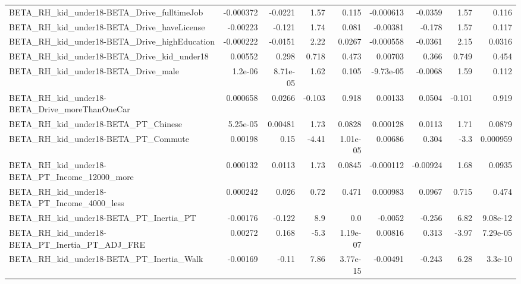 \begin{tabular}{lrrrrrrrr}
BETA\_RH\_kid\_under18-BETA\_Drive\_fulltimeJob         &   -0.000372 &      -0.0221 &     1.57 &    0.115 &  -0.000613 &     -0.0359 &         1.57 &         0.116 \\
BETA\_RH\_kid\_under18-BETA\_Drive\_haveLicense         &    -0.00223 &       -0.121 &     1.74 &    0.081 &   -0.00381 &      -0.178 &         1.57 &         0.117 \\
BETA\_RH\_kid\_under18-BETA\_Drive\_highEducation       &   -0.000222 &      -0.0151 &     2.22 &   0.0267 &  -0.000558 &     -0.0361 &         2.15 &        0.0316 \\
BETA\_RH\_kid\_under18-BETA\_Drive\_kid\_under18         &     0.00552 &        0.298 &    0.718 &    0.473 &    0.00703 &       0.366 &        0.749 &         0.454 \\
BETA\_RH\_kid\_under18-BETA\_Drive\_male                &     1.2e-06 &     8.71e-05 &     1.62 &    0.105 &  -9.73e-05 &     -0.0068 &         1.59 &         0.112 \\
BETA\_RH\_kid\_under18-BETA\_Drive\_moreThanOneCar      &    0.000658 &       0.0266 &   -0.103 &    0.918 &    0.00133 &      0.0504 &       -0.101 &         0.919 \\
BETA\_RH\_kid\_under18-BETA\_PT\_Chinese                &    5.25e-05 &      0.00481 &     1.73 &   0.0828 &   0.000128 &      0.0113 &         1.71 &        0.0879 \\
BETA\_RH\_kid\_under18-BETA\_PT\_Commute                &     0.00198 &         0.15 &    -4.41 & 1.01e-05 &    0.00686 &       0.304 &         -3.3 &      0.000959 \\
BETA\_RH\_kid\_under18-BETA\_PT\_Income\_12000\_more      &    0.000132 &       0.0113 &     1.73 &   0.0845 &  -0.000112 &    -0.00924 &         1.68 &        0.0935 \\
BETA\_RH\_kid\_under18-BETA\_PT\_Income\_4000\_less       &    0.000242 &        0.026 &     0.72 &    0.471 &   0.000983 &      0.0967 &        0.715 &         0.474 \\
BETA\_RH\_kid\_under18-BETA\_PT\_Inertia\_PT             &    -0.00176 &       -0.122 &      8.9 &      0.0 &    -0.0052 &      -0.256 &         6.82 &      9.08e-12 \\
BETA\_RH\_kid\_under18-BETA\_PT\_Inertia\_PT\_ADJ\_FRE     &     0.00272 &        0.168 &     -5.3 & 1.19e-07 &    0.00816 &       0.313 &        -3.97 &      7.29e-05 \\
BETA\_RH\_kid\_under18-BETA\_PT\_Inertia\_Walk           &    -0.00169 &        -0.11 &     7.86 & 3.77e-15 &   -0.00491 &      -0.243 &         6.28 &       3.3e-10 \\

\end{tabular}
